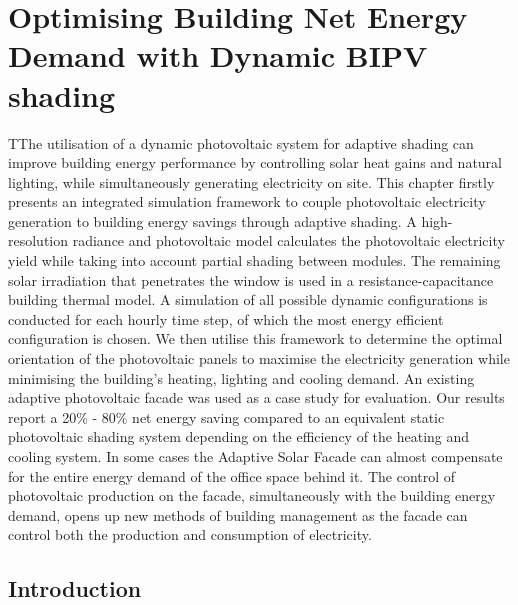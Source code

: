 
\chapter{Optimising Building Net Energy Demand with Dynamic BIPV shading}
\label{ch:asfSimulation}

\graphicspath{{chapters/ch2asfSimulation//Images/}}

\begin{chapterabstract}
TThe utilisation of a dynamic photovoltaic system for adaptive shading can improve building energy performance by controlling solar heat gains and natural lighting, while simultaneously generating electricity on site. This chapter firstly presents an integrated simulation framework to couple photovoltaic electricity generation to building energy savings through adaptive shading. A high-resolution radiance and photovoltaic model calculates the photovoltaic electricity yield while taking into account partial shading between modules. The remaining solar irradiation that penetrates the window is used in a resistance-capacitance building thermal model. A simulation of all possible dynamic configurations is conducted for each hourly time step, of which the most energy efficient configuration is chosen. We then utilise this framework to determine the optimal orientation of the photovoltaic panels to maximise the electricity generation while minimising the building's heating, lighting and cooling demand.  An existing adaptive photovoltaic facade was used as a case study for evaluation. Our results report a 20\% - 80\% net energy saving compared to an equivalent static photovoltaic shading system depending on the efficiency of the heating and cooling system. In some cases the Adaptive Solar Facade can almost compensate for the entire energy demand of the office space behind it. The control of photovoltaic production on the facade, simultaneously with the building energy demand, opens up new methods of building management as the facade can control both the production and consumption of electricity.
\end{chapterabstract}


\newpage

\section{Introduction}
\label{ch:introduction2}


